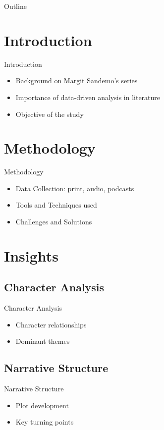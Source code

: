 \documentclass[
    NAME={Dr. Helga Ingimundardóttir},
    EMAIL={helgaingim@hi.is},
    FACULTY={Industrial Engineering},
    TITLE={Pushing Boundaries: A Data-Driven Dive into `Legend of the Ice People'},
    SUBTITLE={Unravel the unexpected synergy of literature and data science},
    SEMINAR={Haustráðstefna Advania},
    DATE={September 8, 2023}
    ]{hi-latex/hi-beamer}
\let\olditem\item
\renewcommand{\item}{\pause\olditem}
\begin{document}
\begin{frame}{Outline}
  \tableofcontents
\end{frame}

\section{Introduction}





\begin{frame}{Introduction}
  \begin{itemize}
    \item Background on Margit Sandemo's series
    \item Importance of data-driven analysis in literature
    \item Objective of the study
  \end{itemize}
\end{frame}

\section{Methodology}
\begin{frame}{Methodology}
  \begin{itemize}
    \item Data Collection: print, audio, podcasts
    \item Tools and Techniques used
    \item Challenges and Solutions
  \end{itemize}
\end{frame}

\section{Insights}
\subsection{Character Analysis}
\begin{frame}{Character Analysis}
  \begin{itemize}
    \item Character relationships
    \item Dominant themes
  \end{itemize}
\end{frame}

\subsection{Narrative Structure}
\begin{frame}{Narrative Structure}
  \begin{itemize}
    \item Plot development
    \item Key turning points
  \end{itemize}
\end{frame}
\end{document}
